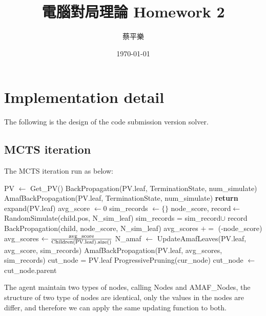 \documentclass[a4paper, 12pt]{article}  %
\title{電腦對局理論 Homework 2}
\author{蔡平樂}
\date{\today}
\begin{document}
\maketitle

\section{Implementation detail}
The following is the design of the code submission version solver.


\subsection{MCTS iteration}
The MCTS iteration run as below:

\begin{algorithm}[!h]
  \begin{algorithmic}
      \State PV $\gets$ Get\_PV()
        \State BackPropagation(PV.leaf, TerminationState, num\_simulate)
        \State AmafBackPropagation(PV.leaf, TerminationState, num\_simulate)
        \State \textbf{return}
      \EndIf
      \State expand(PV.leaf)
      \State avg\_score $\gets 0$
      \State sim\_records $\gets\{\}$
        \State node\_score, record$\gets$ RandomSimulate(child.pos, N\_sim\_leaf)
        \State sim\_records = sim\_record$\cup$ record
        \State BackPropagation(child, node\_score, N\_sim\_leaf)
        \State avg\_scores $+=$ (-node\_score)
      \EndFor
      \State avg\_scores $\gets \rm \frac{avg\_score}{Children(PV.leaf).size()}$
      \State N\_amaf $\gets$ UpdateAmafLeaves(PV.leaf, avg\_score, sim\_records)
      \State AmafBackPropagation(PV.leaf, avg\_scores, sim\_records)
      \State cut\_node = PV.leaf
        \State ProgressivePruning(cur\_node)
        \State cut\_node $\gets$ cut\_node.parent
      \EndWhile
      
      \EndProcedure
  \end{algorithmic}
\end{algorithm}

\newpage

The agent maintain two types of nodes, calling Nodes and AMAF\_Nodes, the structure of two type of nodes are identical, only the values in the nodes are differ, and therefore we can apply the same updating function to both.
\end{document}
